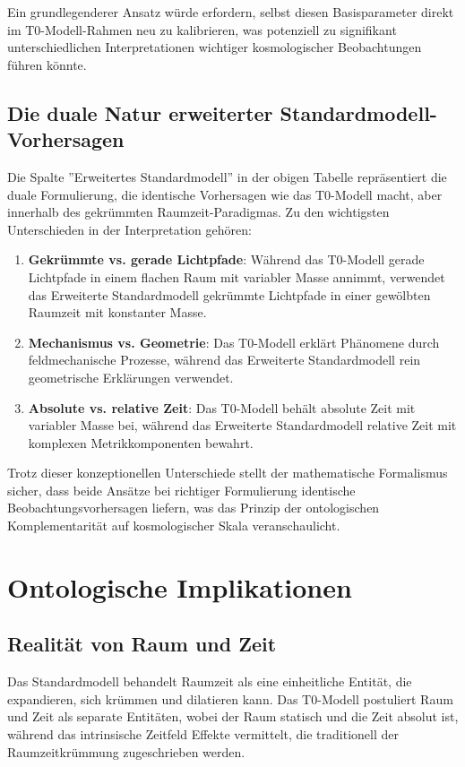\documentclass[12pt,a4paper]{article}
\begin{document}
	Ein grundlegenderer Ansatz würde erfordern, selbst diesen Basisparameter direkt im T0-Modell-Rahmen neu zu kalibrieren, was potenziell zu signifikant unterschiedlichen Interpretationen wichtiger kosmologischer Beobachtungen führen könnte.
	
	\subsection{Die duale Natur erweiterter Standardmodell-Vorhersagen}
	
	Die Spalte ''Erweitertes Standardmodell'' in der obigen Tabelle repräsentiert die duale Formulierung, die identische Vorhersagen wie das T0-Modell macht, aber innerhalb des gekrümmten Raumzeit-Paradigmas. Zu den wichtigsten Unterschieden in der Interpretation gehören:
	
	\begin{enumerate}
		\item \textbf{Gekrümmte vs. gerade Lichtpfade}: Während das T0-Modell gerade Lichtpfade in einem flachen Raum mit variabler Masse annimmt, verwendet das Erweiterte Standardmodell gekrümmte Lichtpfade in einer gewölbten Raumzeit mit konstanter Masse.
		\item \textbf{Mechanismus vs. Geometrie}: Das T0-Modell erklärt Phänomene durch feldmechanische Prozesse, während das Erweiterte Standardmodell rein geometrische Erklärungen verwendet.
		\item \textbf{Absolute vs. relative Zeit}: Das T0-Modell behält absolute Zeit mit variabler Masse bei, während das Erweiterte Standardmodell relative Zeit mit komplexen Metrikkomponenten bewahrt.
	\end{enumerate}
	
	Trotz dieser konzeptionellen Unterschiede stellt der mathematische Formalismus sicher, dass beide Ansätze bei richtiger Formulierung identische Beobachtungsvorhersagen liefern, was das Prinzip der ontologischen Komplementarität auf kosmologischer Skala veranschaulicht.
	
	\section{Ontologische Implikationen}
	
	\subsection{Realität von Raum und Zeit}
	Das Standardmodell behandelt Raumzeit als eine einheitliche Entität, die expandieren, sich krümmen und dilatieren kann. Das T0-Modell postuliert Raum und Zeit als separate Entitäten, wobei der Raum statisch und die Zeit absolut ist, während das intrinsische Zeitfeld Effekte vermittelt, die traditionell der Raumzeitkrümmung zugeschrieben werden.
	
\end{document}
